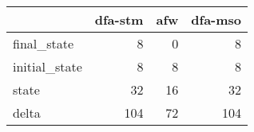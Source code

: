 \begin{tabular}{lrrr}
\toprule
{} &  dfa-stm &  afw &  dfa-mso \\
\midrule
final\_state   &        8 &    0 &        8 \\
initial\_state &        8 &    8 &        8 \\
state         &       32 &   16 &       32 \\
delta         &      104 &   72 &      104 \\
\bottomrule
\end{tabular}
